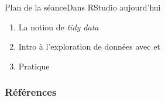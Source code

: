 \documentclass[xcolor=dvipsnames, onlymath, 10pt, aspectratio=169, handout]{beamer}
\begin{document}

\begin{frame}{Plan de la séance}{Dans RStudio aujourd'hui}
	
	\begin{enumerate}
		\item La notion de \emph{tidy data}
		\item Intro à l'exploration de données avec  et  \citep[chapitres 8, 9, 10, 12]{barnier_R}
		\item Pratique
	\end{enumerate}
	
\end{frame}





\appendix
\begin{frame}[allowframebreaks]

{
\footnotesize
        \frametitle{Références}
        
          

}

\end{frame}






%
%  
\end{document}
